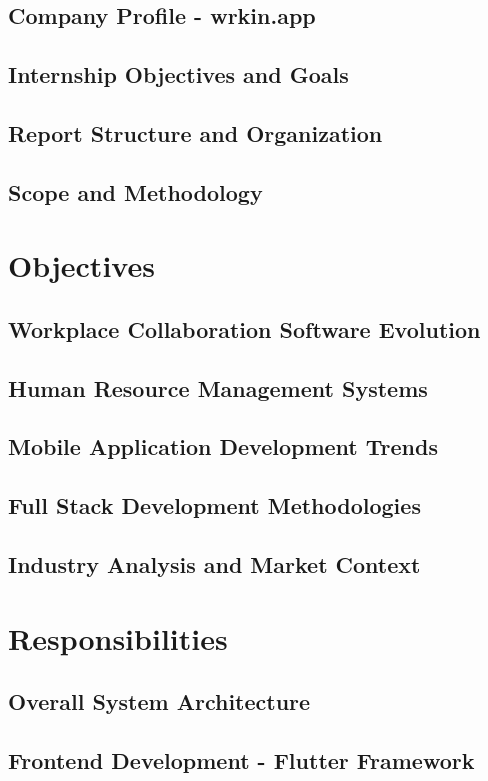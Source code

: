 \documentclass[a4paper, 11pt, oneside]{report}
\begin{document}
\section{Company Profile - wrkin.app}
\section{Internship Objectives and Goals}
\section{Report Structure and Organization}
\section{Scope and Methodology}


\chapter{Objectives}
\section{Workplace Collaboration Software Evolution}
\section{Human Resource Management Systems}
\section{Mobile Application Development Trends}
\section{Full Stack Development Methodologies}
\section{Industry Analysis and Market Context}


\chapter{Responsibilities}
\section{Overall System Architecture}
\section{Frontend Development - Flutter Framework}
\end{document}
